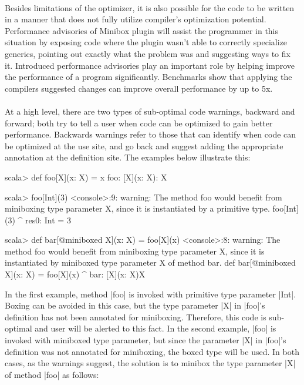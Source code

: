 \paragraph{}
Besides limitations of the optimizer, it is also possible for the code to be written in a manner that does not fully utilize compiler's optimization potential. Performance advisories of Minibox plugin will assist the programmer in this situation by exposing code where the plugin wasn't able to correctly specialize generics, pointing out exactly what the problem was and suggesting ways to fix it. Introduced performance advisories play an important role by helping improve the performance of a program significantly. Benchmarks show that applying the compilers suggested changes can improve overall performance by up to 5x.
\paragraph{}
At a high level, there are two types of sub-optimal code warnings, backward and forward; both try to tell a user when code can be optimized to gain better performance. Backwards warnings refer to those that can identify when code can be optimized at the use site, and go back and suggest adding the appropriate annotation at the definition site. The examples below illustrate this:

\begin{lstlisting-nobreak}
scala> def foo[X](x: X) = x
foo: [X](x: X): X

scala> foo[Int](3)
<console>:9: warning: The method foo would benefit from miniboxing type
parameter X, since it is instantiated by a primitive type.
              foo[Int](3)
                 ^
res0: Int = 3

scala> def bar[@miniboxed X](x: X) = foo[X](x)
<console>:8: warning: The method foo would benefit from miniboxing type
parameter X, since it is instantiated by miniboxed type parameter X of method bar.
       def bar[@miniboxed X](x: X) = foo[X](x)
                               ^
bar: [X](x: X)X
\end{lstlisting-nobreak}
In the first example, method |foo| is invoked with primitive type parameter |Int|. Boxing can be avoided in this case, but the type parameter |X| in |foo|'s definition has not been annotated for miniboxing. Therefore, this code is sub-optimal and user will be alerted to this fact. In the second example, |foo| is invoked with miniboxed type parameter, but since the parameter |X| in |foo|'s definition was not annotated for miniboxing, the boxed type will be used. In both cases, as the warnings suggest, the solution is to minibox the type parameter |X| of method |foo| as follows:

